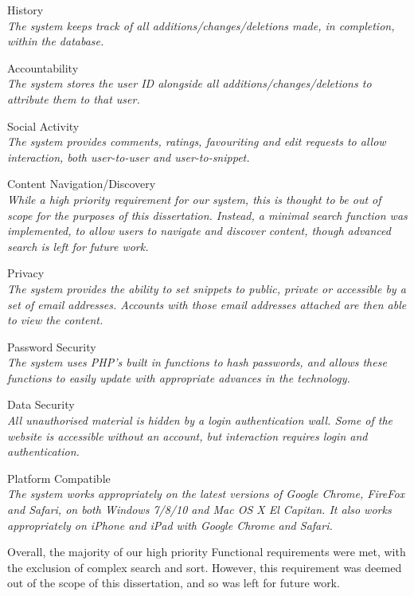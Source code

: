 \begin{requirementsrevisit}

    \item History \label{history} \\
	\textit{The system keeps track of all additions/changes/deletions made, in completion, within the database.}

    \item Accountability \label{accountability} \\
	\textit{The system stores the user ID alongside all additions/changes/deletions to attribute them to that user.}

    \item Social Activity \label{socialactivity} \\
	\textit{The system provides comments, ratings, favouriting and edit requests to allow interaction, both user-to-user and user-to-snippet.}

    \item Content Navigation/Discovery \label{content} \\
	\textit{While a high priority requirement for our system, this is thought to be out of scope for the purposes of this dissertation. Instead, a minimal search function was implemented, to allow users to navigate and discover content, though advanced search is left for future work.}

    \item Privacy \label{privacy} \\
	\textit{The system provides the ability to set snippets to public, private or accessible by a set of email addresses. Accounts with those email addresses attached are then able to view the content.}

    \item Password Security \label{passwordsecurity} \\
	\textit{The system uses PHP's built in functions to hash passwords, and allows these functions to easily update with appropriate advances in the technology.}

    \item Data Security \label{datasecurity} \\
	\textit{All unauthorised material is hidden by a login authentication wall. Some of the website is accessible without an account, but interaction requires login and authentication.}

    \item Platform Compatible \label{platformcompatible} \\
	\textit{The system works appropriately on the latest versions of Google Chrome, FireFox and Safari, on both Windows 7/8/10 and Mac OS X El Capitan. It also works appropriately on iPhone and iPad with Google Chrome and Safari.}

Overall, the majority of our high priority Functional requirements were met, with the exclusion of complex search and sort. However, this requirement was deemed out of the scope of this dissertation, and so was left for future work.

   \end{requirementsrevisit}

